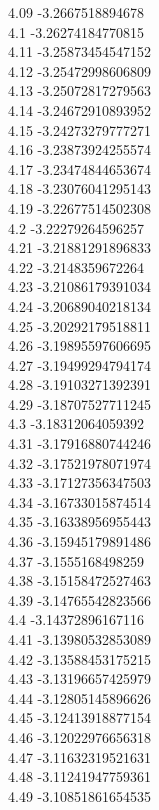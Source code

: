 {4.09	-3.2667518894678\\
4.1	-3.26274184770815\\
4.11	-3.25873454547152\\
4.12	-3.25472998606809\\
4.13	-3.25072817279563\\
4.14	-3.24672910893952\\
4.15	-3.24273279777271\\
4.16	-3.23873924255574\\
4.17	-3.23474844653674\\
4.18	-3.23076041295143\\
4.19	-3.22677514502308\\
4.2	-3.22279264596257\\
4.21	-3.21881291896833\\
4.22	-3.2148359672264\\
4.23	-3.21086179391034\\
4.24	-3.20689040218134\\
4.25	-3.20292179518811\\
4.26	-3.19895597606695\\
4.27	-3.19499294794174\\
4.28	-3.19103271392391\\
4.29	-3.18707527711245\\
4.3	-3.18312064059392\\
4.31	-3.17916880744246\\
4.32	-3.17521978071974\\
4.33	-3.17127356347503\\
4.34	-3.16733015874514\\
4.35	-3.16338956955443\\
4.36	-3.15945179891486\\
4.37	-3.1555168498259\\
4.38	-3.15158472527463\\
4.39	-3.14765542823566\\
4.4	-3.14372896167116\\
4.41	-3.13980532853089\\
4.42	-3.13588453175215\\
4.43	-3.13196657425979\\
4.44	-3.12805145896626\\
4.45	-3.12413918877154\\
4.46	-3.12022976656318\\
4.47	-3.11632319521631\\
4.48	-3.11241947759361\\
4.49	-3.10851861654535\\
}
